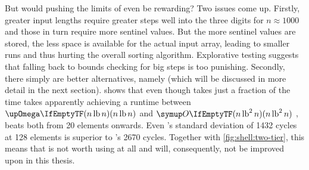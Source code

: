 But would pushing the limits of \ShS{} even be rewarding?
Two issues come up.
Firstly, greater input lengths require greater steps \Dash well into the three digits for \(n \approx 1000\) \cite{skean2023optimization, 10.1007/3-540-44669-9_12} \Dash and those in turn require more sentinel values.
But the more sentinel values are stored, the less space is available for the actual input array, leading to smaller runs and thus hurting the overall sorting algorithm.
Explorative testing suggests that falling back to bounds checking for big steps is too punishing.
Secondly, there simply are better alternatives, namely \QS{} (which will be discussed in more detail in the next section).
 shows that even though \ShS{} takes just a fraction of the time \IS{} takes \Dash apparently achieving a runtime between \(\bigomega{n \lb n}\) and \(\bigoh{n \lb^2 n}\) \Dash\negthinspace, \QS{} beats both from 20 elements onwards.
Even \QS{}'s standard deviation of 1432 cycles at 128 elements is superior to \ShS{}'s 2670 cycles.
Together with \cref{fig:shell:two-tier}, this means that \ShS{} is not worth using at all and will, consequently, not be improved upon in this thesis.

